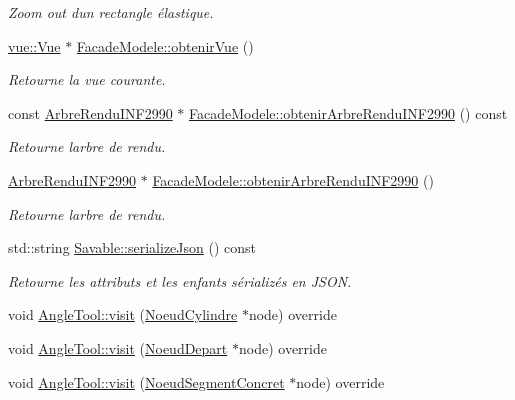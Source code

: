 \begin{DoxyCompactItemize}
\begin{DoxyCompactList}\small\item\em Zoom out d\textquotesingle{}un rectangle élastique. \end{DoxyCompactList}\item 
\hyperlink{classvue_1_1_vue}{vue\+::\+Vue} $\ast$ \hyperlink{group__inf2990_gaa56cf96b7e381e0f14e2c9a55be913bf}{Facade\+Modele\+::obtenir\+Vue} ()
\begin{DoxyCompactList}\small\item\em Retourne la vue courante. \end{DoxyCompactList}\item 
const \hyperlink{class_arbre_rendu_i_n_f2990}{Arbre\+Rendu\+I\+N\+F2990} $\ast$ \hyperlink{group__inf2990_gaf578161d03b2157cdaa3182900ff61cc}{Facade\+Modele\+::obtenir\+Arbre\+Rendu\+I\+N\+F2990} () const 
\begin{DoxyCompactList}\small\item\em Retourne l\textquotesingle{}arbre de rendu. \end{DoxyCompactList}\item 
\hyperlink{class_arbre_rendu_i_n_f2990}{Arbre\+Rendu\+I\+N\+F2990} $\ast$ \hyperlink{group__inf2990_ga12d5594db6a9507b24c7e1ffcd6751af}{Facade\+Modele\+::obtenir\+Arbre\+Rendu\+I\+N\+F2990} ()
\begin{DoxyCompactList}\small\item\em Retourne l\textquotesingle{}arbre de rendu. \end{DoxyCompactList}\item 
std\+::string \hyperlink{group__inf2990_ga454a7c175c0864c3656283bafcb8413e}{Savable\+::serialize\+Json} () const 
\begin{DoxyCompactList}\small\item\em Retourne les attributs et les enfants sérializés en J\+S\+O\+N. \end{DoxyCompactList}\item 
void \hyperlink{group__inf2990_ga925fee2b000babaae1c7947a732a0bba}{Angle\+Tool\+::visit} (\hyperlink{class_noeud_cylindre}{Noeud\+Cylindre} $\ast$node) override
\item 
void \hyperlink{group__inf2990_gaaa2fc24bde51948c2288c375f19d70ae}{Angle\+Tool\+::visit} (\hyperlink{class_noeud_depart}{Noeud\+Depart} $\ast$node) override
\item 
void \hyperlink{group__inf2990_ga0209990747f5f623c71076c02a3ed018}{Angle\+Tool\+::visit} (\hyperlink{class_noeud_segment_concret}{Noeud\+Segment\+Concret} $\ast$node) override

\end{DoxyCompactItemize}

